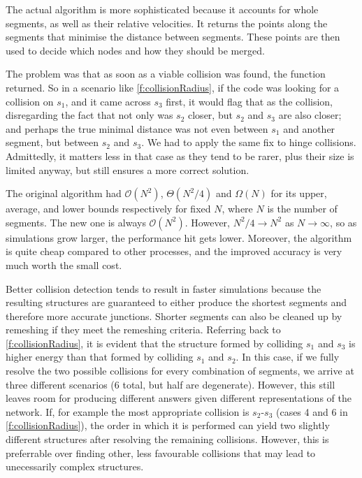 The actual algorithm is more sophisticated because it accounts for whole segments, as well as their relative velocities. It returns the points along the segments that minimise the distance between segments. These points are then used to decide which nodes and how they should be merged.

The problem was that as soon as a viable collision was found, the function returned. So in a scenario like \cref{f:collisionRadius}, if the code was looking for a collision on $s_1$, and it came across $s_3$ first, it would flag that as the collision, disregarding the fact that not only was $s_2$ closer, but $s_2$ and $s_3$ are also closer; and perhaps the true minimal distance was not even between $s_1$ and another segment, but between $s_2$ and $s_3$. We had to apply the same fix to hinge collisions. Admittedly, it matters less in that case as they tend to be rarer, plus their size is limited anyway, but still ensures a more correct solution.

The original algorithm had $\mathcal{O}(N^2)$, $\Theta(N^2/4)$ and $\Omega(N)$ for its upper, average, and lower bounds respectively for fixed $N$, where $N$ is the number of segments. The new one is always $\mathcal{O}(N^2)$. However, $N^2/4 \to N^2$ as $N\to\infty$, so as simulations grow larger, the performance hit gets lower. Moreover, the algorithm is quite cheap compared to other processes, and the improved accuracy is very much worth the small cost.

Better collision detection tends to result in faster simulations because the resulting structures are guaranteed to either produce the shortest segments and therefore more accurate junctions. Shorter segments can also be cleaned up by remeshing if they meet the remeshing criteria. Referring back to \cref{f:collisionRadius}, it is evident that the structure formed by colliding $s_1$ and $s_3$ is higher energy than that formed by colliding $s_1$ and $s_2$. In this case, if we fully resolve the two possible collisions for every combination of segments, we arrive at three different scenarios (6 total, but half are degenerate). However, this still leaves room for producing different answers given different representations of the network. If, for example the most appropriate collision is $s_2$-$s_3$ (cases 4 and 6 in \cref{f:collisionRadius}), the order in which it is performed can yield two slightly different structures after resolving the remaining collisions. However, this is preferrable over finding other, less favourable collisions that may lead to unecessarily complex structures.

